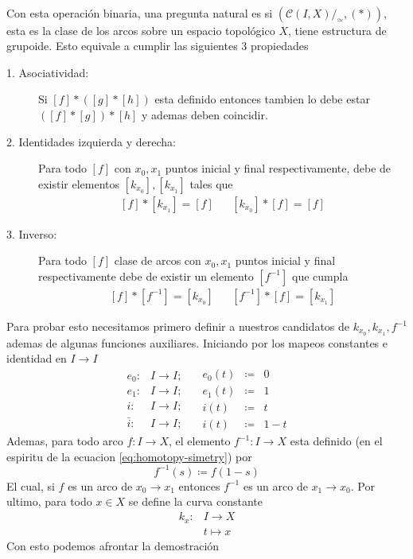 \paragraph{} Con esta operación binaria, una pregunta natural es si
\((\mathcal C (I , X)/_\simeq , (*))\), esta es la clase de los arcos
sobre un espacio topológico \(X\), tiene estructura de grupoide. Esto
equivale a cumplir las siguientes 3 propiedades
\begin{description}
\item[1. Asociatividad:] Si \([f] * ([g] * [h])\) esta definido entonces
  tambien lo debe estar \(([f] * [g]) * [h]\) y ademas deben coincidir.
\item[2. Identidades izquierda y derecha:] Para todo \([f]\) con
  \(x_0, x_1\) puntos inicial y final respectivamente, debe de
existir elementos \([k_{x_0}], [k_{x_1}]\) tales que
\[ \begin{matrix}
    [f] * [k_{x_1}] = [f] & & [k_{x_0}] * [f] = [f]
  \end{matrix}
\]
\item[3. Inverso:] Para todo \([f]\) clase de arcos con \(x_0, x_1\)
  puntos inicial y final respectivamente debe de existir un elemento
  \([f^{-1}]\) que cumpla
\[ \begin{matrix}
    [f] * [f^{-1}] = [k_{x_0}] & & [f^{-1}] * [f] = [k_{x_1}]
  \end{matrix}
\]
\end{description}
Para probar esto necesitamos primero definir a nuestros candidatos de
\(k_{x_0}, k_{x_1}, f^{-1}\) ademas de algunas funciones auxiliares.
Iniciando por los mapeos constantes e identidad en \(I \to I\)
\begin{equation} \label{eq:def-auxiliar-grupoide}
  \begin{matrix}
     e_0 :     & I \to I; \\
     e_1 :     & I \to I; \\
     i :       & I \to I; \\
     \bar{i} : & I \to I;
   \end{matrix}
   \quad
   \begin{matrix}
      e_0(t) &\coloneqq &0 \\
      e_1(t) &\coloneqq &1 \\
      i(t)   &\coloneqq &t   \\
      i(t)   &\coloneqq &1 - t
   \end{matrix}
\end{equation}
Ademas, para todo arco \(f : I \to X \), el elemento \(f^{-1} : I \to X \) esta
definido (en el espiritu de la ecuacion \eqref{eq:homotopy-simetry}) por
\[ f^{-1} (s) \coloneqq f (1 - s) \]
El cual, si \(f\) es un arco de \(x_0 \to x_1\) entonces \(f^{-1}\) es
un arco de \(x_1 \to x_0\). Por ultimo, para todo \(x \in X \) se define
la curva constante
\begin{align*}
  k_x : &I \longrightarrow X \\
        &t \longmapsto x
\end{align*}
Con esto podemos afrontar la demostración

